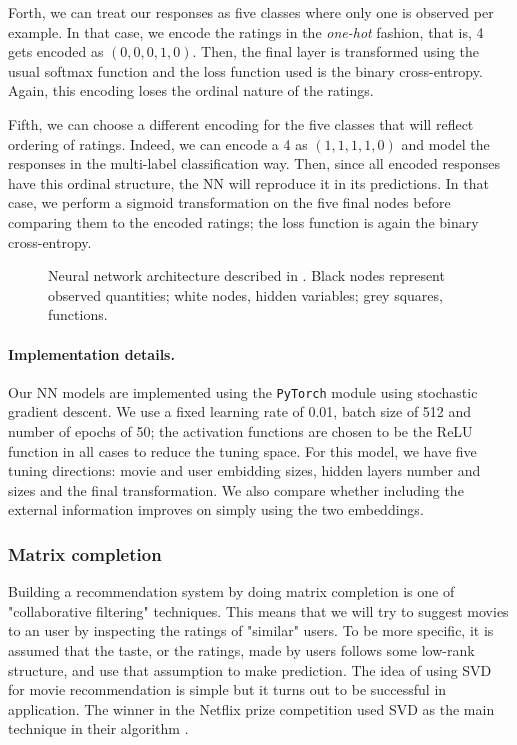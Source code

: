 \documentclass[bj, preprint]{imsart}
\begin{document}
Forth, we can treat our responses as five classes where only one is observed per example. In that case, we encode the ratings in the \textit{one-hot} fashion, that is, 4 gets encoded as $(0,0,0,1,0)$. Then, the final layer is transformed using the usual softmax function and the loss function used is the binary cross-entropy. Again, this encoding loses the ordinal nature of the ratings.

Fifth, we can choose a different encoding for the five classes that will reflect ordering of ratings. Indeed, we can encode a 4 as $(1,1,1,1,0)$ and model the responses in the multi-label classification way. Then, since all encoded responses have this ordinal structure, the NN will reproduce it in its predictions. In that case, we perform a sigmoid transformation on the five final nodes before comparing them to the encoded ratings; the loss function is again the binary cross-entropy.




\begin{figure}

\caption{Neural network architecture described in . Black nodes represent observed quantities; white nodes, hidden variables; grey squares, functions.\label{fig:method.models.nn}}
\end{figure}

\paragraph{Implementation details.}\label{par:method.models.nn.impl}

Our NN models are implemented using the \texttt{PyTorch} module \citep{paszke2017automatic} using stochastic gradient descent. We use a fixed learning rate of \num{0.01}, batch size of \num{512} and number of epochs of \num{50}; the activation functions are chosen to be the ReLU function in all cases to reduce the tuning space. For this model, we have five tuning directions: movie and user embidding sizes, hidden layers number and sizes and the final transformation. We also compare whether including the external information improves on simply using the two embeddings.

\subsubsection{Matrix completion}\label{subsubsec:method.models.svd}
Building a recommendation system by doing matrix completion is one of "collaborative filtering" techniques. This means that we will try to suggest movies to an user by inspecting the ratings of "similar" users. To be more specific, it is assumed that the taste, or the ratings, made by users follows some low-rank structure, and use that assumption to make prediction. The idea of using SVD for movie recommendation is simple but it turns out to be successful in application. The winner in the Netflix prize competition used SVD as the main technique in their algorithm \cite{bennett2007netflix}. 
\end{document}
